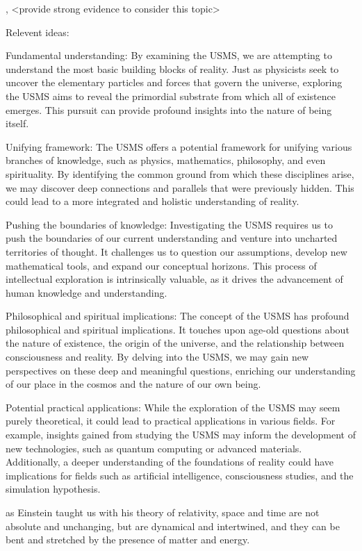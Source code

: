 , <provide strong evidence to consider this topic>

Relevent ideas:

Fundamental understanding: By examining the USMS, we are attempting to understand the most basic building blocks of reality. Just as physicists seek to uncover the elementary particles and forces that govern the universe, exploring the USMS aims to reveal the primordial substrate from which all of existence emerges. This pursuit can provide profound insights into the nature of being itself.

Unifying framework: The USMS offers a potential framework for unifying various branches of knowledge, such as physics, mathematics, philosophy, and even spirituality. By identifying the common ground from which these disciplines arise, we may discover deep connections and parallels that were previously hidden. This could lead to a more integrated and holistic understanding of reality.

Pushing the boundaries of knowledge: Investigating the USMS requires us to push the boundaries of our current understanding and venture into uncharted territories of thought. It challenges us to question our assumptions, develop new mathematical tools, and expand our conceptual horizons. This process of intellectual exploration is intrinsically valuable, as it drives the advancement of human knowledge and understanding.

Philosophical and spiritual implications: The concept of the USMS has profound philosophical and spiritual implications. It touches upon age-old questions about the nature of existence, the origin of the universe, and the relationship between consciousness and reality. By delving into the USMS, we may gain new perspectives on these deep and meaningful questions, enriching our understanding of our place in the cosmos and the nature of our own being.

Potential practical applications: While the exploration of the USMS may seem purely theoretical, it could lead to practical applications in various fields. For example, insights gained from studying the USMS may inform the development of new technologies, such as quantum computing or advanced materials. Additionally, a deeper understanding of the foundations of reality could have implications for fields such as artificial intelligence, consciousness studies, and the simulation hypothesis.


as Einstein taught us with his theory of relativity, space and time are not absolute and unchanging, but are dynamical and intertwined, and they can be bent and stretched by the presence of matter and energy.

